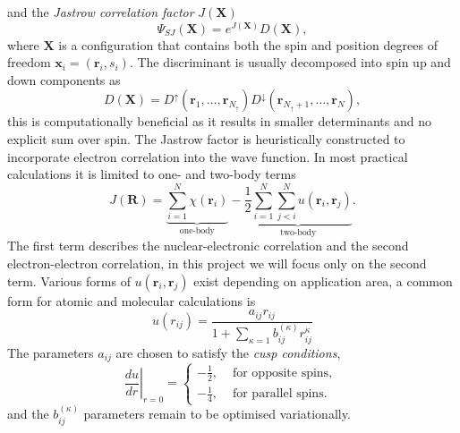 \documentclass[final,3p,times,twocolumn]{elsarticle}
\begin{document}
	and the \emph{Jastrow correlation factor} $J(\mathbf{X})$
	\begin{equation}
		\Psi_{SJ}(\mathbf{X})=e^{J(\mathbf{X})} D(\mathbf{X}),
	\end{equation}
	where $\mathbf{X}$ is a configuration that contains both the spin and position degrees of freedom $\mathbf{x}_i = (\mathbf{r}_i, s_i)$. The discriminant is usually decomposed into spin up and down components as
	\begin{equation}
		D(\mathbf{X}) = D^{\uparrow}\left(\mathbf{r}_{1}, \ldots, \mathbf{r}_{N_{\uparrow}}\right) D^{\downarrow}\left(\mathbf{r}_{N_{\uparrow}+1}, \ldots, \mathbf{r}_{N}\right),
	\end{equation}
	this is computationally beneficial as it results in smaller determinants and no explicit sum over spin.
	The Jastrow factor is heuristically constructed to incorporate electron correlation into the wave function. In most practical calculations it is limited to one- and two-body terms~\cite{foulkes2001quantum}
	\begin{equation}
		J(\mathbf{R})=
		\underbrace{\sum_{i=1}^{N} \chi\left(\mathbf{r}_{i}\right)}_{\text{one-body}}
		-
		\underbrace{\frac{1}{2} \sum_{i=1}^{N} \sum_{j<i}^{N} u\left(\mathbf{r}_{i}, \mathbf{r}_{j}\right)}_{\text{two-body}}.
	\end{equation}
	The first term describes the nuclear-electronic correlation and the second electron-electron correlation, in this project we will focus only on the second term. 
	Various forms of $u(\mathbf{r}_{i}, \mathbf{r}_{j})$ exist depending on application area, a common form for atomic and molecular calculations is
	\begin{equation}
		u(r_{ij})=\frac{a_{ij} r_{ij}}{1+\sum_{\kappa=1} b^{(\kappa)}_{ij} r^\kappa_{ij}}
	\end{equation}
	The parameters $a_{ij}$ are chosen to satisfy the \emph{cusp conditions},  
	\begin{equation}
		\left.\frac{d u}{d r}\right|_{r=0}=\left\{\begin{array}{cl}-\frac{1}{2}, & \text { for opposite spins, } \\ -\frac{1}{4}, & \text { for parallel spins. }\end{array}\right.
	\end{equation}
	and the $b^{(\kappa)}_{ij}$ parameters remain to be optimised variationally. 
	
\end{document}
